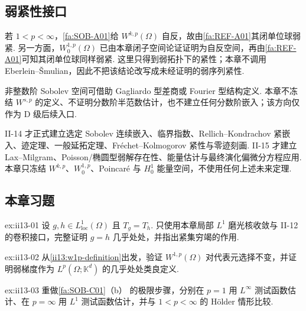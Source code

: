 \subsection{弱紧性接口}

若 \(\displaystyle1<p<\infty\)，\autoref{fa:SOB-A01}给 \(\displaystyle W^{k,p}(\Omega)\) 自反，故由\autoref{fa:REF-A01}其闭单位球弱紧. 另一方面，\(\displaystyle W_0^{1,p}(\Omega)\) 已由本章闭子空间论证证明为自反空间，再由\autoref{fa:REF-A01}可知其闭单位球同样弱紧. 这里只得到弱拓扑下的紧性；本章不调用 Eberlein--Šmulian，因此不把该结论改写成未经证明的弱序列紧性.

\begin{FARemark}
非整数阶 Sobolev 空间可借助 Gagliardo 型差商或 Fourier 型结构定义. 本章不冻结 \(\displaystyle W^{s,p}\) 的定义、不证明分数阶半范数估计，也不建立任何分数阶嵌入；该方向仅作为 D 级后续入口.
\end{FARemark}

\begin{FAWarning}[II-14 与 II-15的理论边界]
II-14 才正式建立选定 Sobolev 连续嵌入、临界指数、Rellich--Kondrachov 紧嵌入、迹定理、一般延拓定理、Fréchet--Kolmogorov 紧性与零迹刻画. II-15 才建立 Lax--Milgram、Poisson/椭圆型弱解存在性、能量估计与最终演化偏微分方程应用. 本章只冻结 \(\displaystyle W^{k,p}\)、\(\displaystyle W_0^{1,p}\)、Poincaré 与 \(\displaystyle H_0^1\) 能量空间，不使用任何上述未来定理.
\end{FAWarning}

\subsection*{本章习题}\label{sec:ii13-exercises}

\begin{FAExercise}[弱导数代表元唯一性]{ex:ii13-01}
设 \(\displaystyle g,h\in L^1_{\mathrm{loc}}(\Omega)\) 且 \(\displaystyle T_g=T_h\). 只使用本章局部 \(\displaystyle L^1\) 磨光核收敛与 II-12 的卷积接口，完整证明 \(\displaystyle g=h\) 几乎处处，并指出紧集穷竭的作用.
\end{FAExercise}

\begin{FAExercise}{ex:ii13-02}
从\autoref{ii13:w1p-definition}出发，验证 \(\displaystyle W^{1,p}(\Omega)\) 对代表元选择不变，并证明弱梯度作为 \(\displaystyle L^p(\Omega;\mathbb K^d)\) 的几乎处处类良定义.
\end{FAExercise}

\begin{FAExercise}[端点配对估计]{ex:ii13-03}
重做\autoref{fa:SOB-C01}（b） 的极限步骤，分别在 \(\displaystyle p=1\) 用 \(\displaystyle L^\infty\) 测试函数估计、在 \(\displaystyle p=\infty\) 用 \(\displaystyle L^1\) 测试函数估计，并与 \(\displaystyle1<p<\infty\) 的 Hölder 情形比较.
\end{FAExercise}

